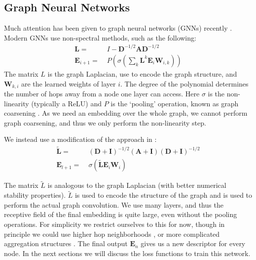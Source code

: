 \documentclass[10pt,twocolumn,letterpaper]{article}
\newcommand{\mat}[1]{\mathbf{#1}}
\begin{document}
\subsection{Graph Neural Networks}
Much attention has been given to graph neural networks (GNNs) recently
\cite{bronstein2017geometric, bruna2013spectral, defferrard2016convolutional, kipf2016semi, scarselli2009graph, gama2018mimo, gama2018convolutional, battaglia2018relational}.
Modern GNNs use non-spectral methods, such as the following:
\begin{align}
      \mat{L} =&\; I - \mat{D}^{-1/2} \mat{A} \mat{D}^{-1/2} \\
\mat{E}_{i+1} =&\; P\left(\sigma\left( \sum_k \mat{L}^k \mat{E}_i \mat{W}_{i,k} \right)\right)
\end{align}
The matrix $L$ is the graph Laplacian, use to encode the graph structure, and $\mat{W}_{k,i}$ are the learned weights of layer $i$.
The degree of the polynomial determines the number of hops away from a node one layer can access.
Here $\sigma$ is the non-linearity (typically a ReLU) and $P$ is the `pooling' operation, known as graph coarsening \cite{bronstein2017geometric, gama2018mimo}.
As we need an embedding over the whole graph, we cannot perform graph coarsening, and thus we only perform the non-linearity step.

We instead use a modification of the approach in \cite{kipf2016semi}:
\begin{align}
      \widetilde{\mat{L}} =&\; (\mat{D} + \mat{I})^{-1/2} (\mat{A} + \mat{I}) (\mat{D} + \mat{I})^{-1/2} \\
\mat{E}_{l+1} =&\; \sigma\left(\widetilde{\mat{L}} \mat{E}_i \mat{W}_i \right)  \label{eq:graph_conv}
\end{align}

The matrix $\widetilde{L}$ is analogous to the graph Laplacian (with better numerical stability properties).
$\widetilde{L}$ is used to encode the structure of the graph and is used to perform the actual graph convolution.
We use many layers, and thus the receptive field of the final embedding is quite large, even without the pooling operations.
For simplicity we restrict ourselves to this for now, though in principle we could use higher hop neighborhoods \cite{gama2018convolutional}, or more complicated aggregation structures \cite{battaglia2018relational}.
The final output $\mat{E}_n$ gives us a new descriptor for every node.
In the next sections we will discuss the loss functions to train this network.
\end{document}
